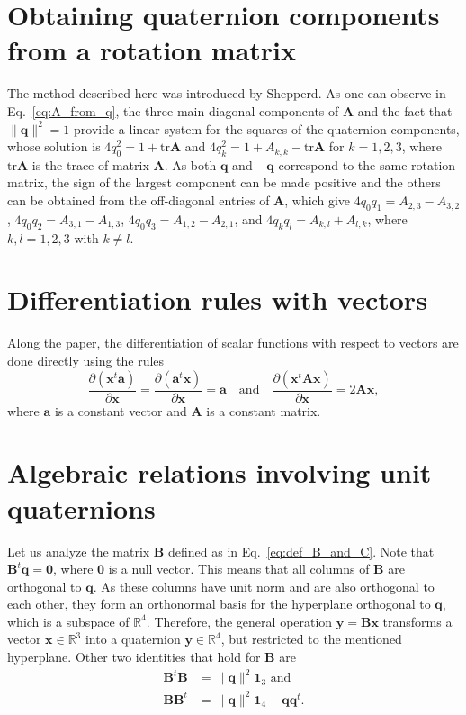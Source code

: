 \documentclass[aip,jcp,reprint,amsmath,amssymb,raggedbottom]{revtex4-1}
\newcommand{\mt}[1]{\boldsymbol{\mathbf{#1}}}           %
\newcommand{\vt}[1]{\boldsymbol{\mathbf{#1}}}           %
\newcommand{\tr}[1]{#1^t}                               %
\newcommand{\diff}[2]{\dfrac{\partial #1}{\partial #2}} %
\begin{document}
\appendix

\section{Obtaining quaternion components from a rotation matrix}
\label{sec:quat_from_A}

The method described here was introduced by Shepperd.\cite{Shepperd1978} As one can observe in Eq.~\ref{eq:A_from_q}, the three main diagonal components of $\mt A$ and the fact that $\lVert \vt q \lVert^2 = 1$ provide a linear system for the squares of the quaternion components, whose solution is $4 q_0^2 = 1 + \text{tr}\mt A$ and $4 q_k^2 = 1 + A_{k,k} - \text{tr}\mt A$ for $k = 1, 2, 3$, where $\text{tr}\mt A$ is the trace of matrix $\mt A$. As both $\vt q$ and $- \vt q$ correspond to the same rotation matrix, the sign of the largest component\cite{Shepperd1978} can be made positive and the others can be obtained from the off-diagonal entries of $\mt A$, which give $4 q_0 q_1 = A_{2,3} - A_{3,2}$, $4 q_0 q_2 = A_{3,1} - A_{1,3}$, $4 q_0 q_3 = A_{1,2} - A_{2,1}$, and $4 q_k q_l = A_{k,l} + A_{l,k}$, where $k,l = 1,2,3$ with $k \neq l$.

\section{Differentiation rules with vectors}
\label{sec:Diff_Rules}

Along the paper, the differentiation of scalar functions with respect to vectors are done directly using the rules
\[
\diff{(\tr{\vt x}\vt a)}{\vt x} = \diff{(\tr{\vt a}\vt x)}{\vt x} = \vt a \quad \text{and} \quad \diff{(\tr{\vt x}\mt A \vt x)}{\vt x} = 2 \mt A \vt x,
\]
where $\vt a$ is a constant vector and $\mt A$ is a constant matrix.

\section{Algebraic relations involving unit quaternions}
\label{sec:auxiliary_math}

Let us analyze the matrix $\mt B$ defined as in Eq.~\ref{eq:def_B_and_C}. Note that $\tr{\mt B}\vt q = \vt 0$, where $\vt 0$ is a null vector.\cite{Haug1989, Shuster1993, Dichmann1999} This means that all columns of $\mt B$ are orthogonal to $\vt q$. As these columns have unit norm and are also orthogonal to each other, they form an orthonormal basis for the hyperplane orthogonal to $\mt q$, which is a subspace of $\mathbb{R}^4$. Therefore, the general operation $\vt y = \mt B \vt x$ transforms a vector $\vt x \in \mathbb{R}^3$ into a quaternion $\vt y \in \mathbb{R}^4$, but restricted to the mentioned hyperplane. Other two identities that hold for $\mt B$ are\citep{Haug1989}
\begin{align*}
\tr{\mt B}\mt B &= \lVert \vt q \lVert ^2{\mt 1}_3 \text{ and} \\
\mt B\tr{\mt B} &= \lVert \vt q \lVert ^2{\mt 1}_4 - {\vt q}\tr{\vt q}.
\end{align*}
\end{document}
